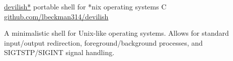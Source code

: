 \showoff
{\href{https://liambeckman.com/code/devilish}{devilish*}}
{portable shell for *nix operating systems}
{C}
{\href{https://github.com/lbeckman314/devilish}{github.com/lbeckman314/devilish}}

A minimalistic shell for Unix-like operating systems. Allows for standard input/output redirection, foreground/background processes, and SIGTSTP/SIGINT signal handling.

\myBreak
